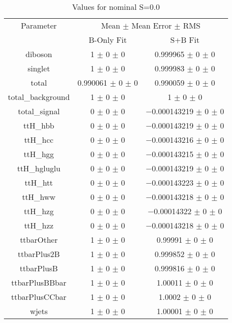 \begin{table}
\centering
\caption{Values for nominal S=0.0}
\begin{tabular}{ccc}
\toprule
Parameter & \multicolumn{2}{c}{Mean $\pm$ Mean Error $\pm$ RMS}\\
 & B-Only Fit & S+B Fit\\
\midrule
diboson & \num{1} $\pm$ \num{0} $\pm$ \num{0} & \num{0.999965} $\pm$ \num{0} $\pm$ \num{0}\\
singlet & \num{1} $\pm$ \num{0} $\pm$ \num{0} & \num{0.999983} $\pm$ \num{0} $\pm$ \num{0}\\
total & \num{0.990061} $\pm$ \num{0} $\pm$ \num{0} & \num{0.990059} $\pm$ \num{0} $\pm$ \num{0}\\
total\_background & \num{1} $\pm$ \num{0} $\pm$ \num{0} & \num{1} $\pm$ \num{0} $\pm$ \num{0}\\
total\_signal & \num{0} $\pm$ \num{0} $\pm$ \num{0} & \num{-0.000143219} $\pm$ \num{0} $\pm$ \num{0}\\
ttH\_hbb & \num{0} $\pm$ \num{0} $\pm$ \num{0} & \num{-0.000143219} $\pm$ \num{0} $\pm$ \num{0}\\
ttH\_hcc & \num{0} $\pm$ \num{0} $\pm$ \num{0} & \num{-0.000143216} $\pm$ \num{0} $\pm$ \num{0}\\
ttH\_hgg & \num{0} $\pm$ \num{0} $\pm$ \num{0} & \num{-0.000143215} $\pm$ \num{0} $\pm$ \num{0}\\
ttH\_hgluglu & \num{0} $\pm$ \num{0} $\pm$ \num{0} & \num{-0.000143219} $\pm$ \num{0} $\pm$ \num{0}\\
ttH\_htt & \num{0} $\pm$ \num{0} $\pm$ \num{0} & \num{-0.000143223} $\pm$ \num{0} $\pm$ \num{0}\\
ttH\_hww & \num{0} $\pm$ \num{0} $\pm$ \num{0} & \num{-0.000143218} $\pm$ \num{0} $\pm$ \num{0}\\
ttH\_hzg & \num{0} $\pm$ \num{0} $\pm$ \num{0} & \num{-0.00014322} $\pm$ \num{0} $\pm$ \num{0}\\
ttH\_hzz & \num{0} $\pm$ \num{0} $\pm$ \num{0} & \num{-0.000143218} $\pm$ \num{0} $\pm$ \num{0}\\
ttbarOther & \num{1} $\pm$ \num{0} $\pm$ \num{0} & \num{0.99991} $\pm$ \num{0} $\pm$ \num{0}\\
ttbarPlus2B & \num{1} $\pm$ \num{0} $\pm$ \num{0} & \num{0.999852} $\pm$ \num{0} $\pm$ \num{0}\\
ttbarPlusB & \num{1} $\pm$ \num{0} $\pm$ \num{0} & \num{0.999816} $\pm$ \num{0} $\pm$ \num{0}\\
ttbarPlusBBbar & \num{1} $\pm$ \num{0} $\pm$ \num{0} & \num{1.00011} $\pm$ \num{0} $\pm$ \num{0}\\
ttbarPlusCCbar & \num{1} $\pm$ \num{0} $\pm$ \num{0} & \num{1.0002} $\pm$ \num{0} $\pm$ \num{0}\\
wjets & \num{1} $\pm$ \num{0} $\pm$ \num{0} & \num{1.00001} $\pm$ \num{0} $\pm$ \num{0}\\
\bottomrule
\end{tabular}
\end{table}